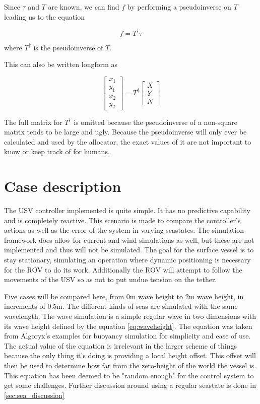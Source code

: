 \documentclass[class=article, crop=false]{standalone}
\begin{document}
Since \(\tau\) and \(T\) are known, we can find \(f\) by performing a pseudoinverse on \(T\) leading us to the equation

\begin{equation}\label{eq:final_allocator}
f = T^\dagger \tau
\end{equation}

where \(T^\dagger\) is the pseudoinverse of \(T\).

This can also be written longform as

\begin{equation}\label{eq:long_allocator}
\begin{bmatrix}x_1 \\ y_1 \\ x_2 \\ y_2 \end{bmatrix} = T^\dagger \begin{bmatrix}X \\ Y \\ N\end{bmatrix}
\end{equation}

The full matrix for \(T^\dagger\) is omitted because the pseudoinverse of a non-square matrix tends to be large and ugly. Because the pseudoinverse will only ever be calculated and used by the allocator, the exact values of it are not important to know or keep track of for humans.

\section{Case description}
The USV controller implemented is quite simple. It has no predictive capability and is completely reactive. This scenario is made to compare the controller's actions as well as the error of the system in varying seastates. The simulation framework does allow for current and wind simulations as well, but these are not implemented and thus will not be simulated. The goal for the surface vessel is to stay stationary, simulating an operation where dynamic positioning is necessary for the ROV to do its work. Additionally the ROV will attempt to follow the movements of the USV so as not to put undue tension on the tether.

Five cases will be compared here, from 0m wave height to 2m wave height, in increments of 0.5m. The different kinds of seas are simulated with the same wavelength. The wave simulation is a simple regular wave in two dimensions with its wave height defined by the equation \cref{eq:waveheight}. The equation was taken from Algoryx's examples for buoyancy simulation for simplicity and ease of use. The actual value of the equation is irrelevant in the larger scheme of things because the only thing it's doing is providing a local height offset. This offset will then be used to determine how far from the zero-height of the world the vessel is. This equation has been deemed to be "random enough" for the control system to get some challenges. Further discussion around using a regular seastate is done in \cref{sec:sea_discussion}
\end{document}
